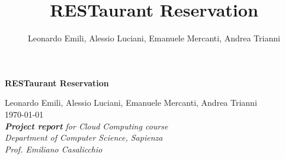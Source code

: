 \documentclass{article}
\title{\textbf{RESTaurant Reservation}}
\author{Leonardo Emili, Alessio Luciani, Emanuele Mercanti, Andrea Trianni}
\begin{document}
    
	\begin{titlepage}
	
	\centering
	\textbf{{\Large RESTaurant Reservation} }
	\vspace{0.2in}
	 
	 Leonardo Emili, Alessio Luciani, Emanuele Mercanti, Andrea Trianni\\


	 \vspace{0.1cm}\today
	\vspace{0.5in}
\textit{	\\	 \textbf{Project report} for Cloud Computing course \\
Department of Computer Science, Sapienza \\
	Prof. Emiliano Casalicchio} \\
	
	
	\vspace{1in}
	\tableofcontents
	\end{titlepage}

	\vspace{1in}
    \clearpage

    
    
    
    
    
    

\end{document}
